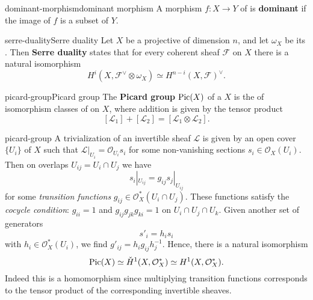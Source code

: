 \begin{topic}{dominant-morphism}{dominant morphism}
    A morphism $f : X \to Y$ of  is \textbf{dominant} if the image of $f$ is a  subset of $Y$.
\end{topic}

\begin{topic}{serre-duality}{Serre duality}
    Let $X$ be a  projective  of dimension $n$, and let $\omega_X$ be its . Then \textbf{Serre duality} states that for every coherent sheaf $\mathcal{F}$ on $X$ there is a natural isomorphism
    \[ H^i(X, \mathcal{F}^\vee \otimes \omega_X) \simeq H^{n - i}(X, \mathcal{F})^\vee . \]
\end{topic}

\begin{topic}{picard-group}{Picard group}
    The \textbf{Picard group} $\textup{Pic}(X)$ of a  $X$ is the  of isomorphism classes of  on $X$, where addition is given by the tensor product
    \[ [\mathcal{L}_1] + [\mathcal{L}_2] = [\mathcal{L}_1 \otimes \mathcal{L}_2] . \]
\end{topic}

\begin{example}{picard-group}
    A trivialization of an invertible sheaf $\mathcal{L}$ is given by an open cover $\{ U_i \}$ of $X$ such that $\mathcal{L}|_{U_i} = \mathcal{O}_{U_i} s_i$ for some non-vanishing sections $s_i \in \mathcal{O}_X(U_i)$. Then on overlaps $U_{ij} = U_i \cap U_j$ we have
    \[ s_i|_{U_{ij}} = g_{ij} s_j|_{U_{ij}} \]
    for some \textit{transition functions} $g_{ij} \in \mathcal{O}_X^*(U_i \cap U_j)$. These functions satisfy the \textit{cocycle condition}: $g_{ii} = 1$ and $g_{ij} g_{jk} g_{ki} = 1$ on $U_i \cap U_j \cap U_k$. Given another set of generators
    \[ s'_i = h_i s_i \]
    with $h_i \in \mathcal{O}_X^*(U_i)$, we find $g'_{ij} = h_i g_{ij} h_j^{-1}$. Hence, there is a natural isomorphism
    \[ \textup{Pic}(X) \simeq \check{H}^1(X, \mathcal{O}_X^*) \simeq H^1(X, \mathcal{O}_X^*) . \]
    Indeed this is a homomorphism since multiplying transition functions corresponds to the tensor product of the corresponding invertible sheaves.
\end{example}


